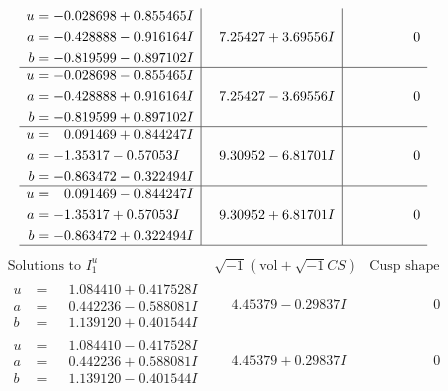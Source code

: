 \documentclass[1p]{elsarticle_modified}
\theoremstyle{definition}
\newcommand{\I}{\sqrt{-1}}
\begin{document}
$$\begin{array}{c|c|c}
\begin{aligned}
u &= -0.028698 + 0.855465 I \\
a &= -0.428888 - 0.916164 I \\
b &= -0.819599 - 0.897102 I\end{aligned}
 & \phantom{-}7.25427 + 3.69556 I & \phantom{-0.000000 } 0 \\ \hline\begin{aligned}
u &= -0.028698 - 0.855465 I \\
a &= -0.428888 + 0.916164 I \\
b &= -0.819599 + 0.897102 I\end{aligned}
 & \phantom{-}7.25427 - 3.69556 I & \phantom{-0.000000 } 0 \\ \hline\begin{aligned}
u &= \phantom{-}0.091469 + 0.844247 I \\
a &= -1.35317 - 0.57053 I \\
b &= -0.863472 - 0.322494 I\end{aligned}
 & \phantom{-}9.30952 - 6.81701 I & \phantom{-0.000000 } 0 \\ \hline\begin{aligned}
u &= \phantom{-}0.091469 - 0.844247 I \\
a &= -1.35317 + 0.57053 I \\
b &= -0.863472 + 0.322494 I\end{aligned}
 & \phantom{-}9.30952 + 6.81701 I & \phantom{-0.000000 } 0\\
 \hline 
 \end{array}$$\newpage$$\begin{array}{c|c|c}  
\text{Solutions to }I^u_{1}& \I (\text{vol} + \sqrt{-1}CS) & \text{Cusp shape}\\
 \hline 
\begin{aligned}
u &= \phantom{-}1.084410 + 0.417528 I \\
a &= \phantom{-}0.442236 - 0.588081 I \\
b &= \phantom{-}1.139120 + 0.401544 I\end{aligned}
 & \phantom{-}4.45379 - 0.29837 I & \phantom{-0.000000 } 0 \\ \hline\begin{aligned}
u &= \phantom{-}1.084410 - 0.417528 I \\
a &= \phantom{-}0.442236 + 0.588081 I \\
b &= \phantom{-}1.139120 - 0.401544 I\end{aligned}
 & \phantom{-}4.45379 + 0.29837 I & \phantom{-0.000000 } 0 \\ \hline\begin{aligned}

\end{aligned}
\end{array}$$
\end{document}
